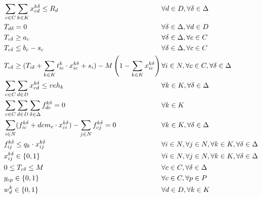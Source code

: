\documentclass[preprint,review,12pt]{elsarticle}
\begin{document}
\begin{align}
	& \sum\limits_{c \in C} \sum\limits_{k \in K}x_{cd}^{k\delta} \leq R_d  && \text{\hspace{-1cm}} \forall d \in D, \forall \delta \in \Delta \label{PCVRP_CapacityD}\\
	& T_{d\delta} = 0  && \text{\hspace{-1cm}} \forall \delta \in \Delta, \forall d \in D \label{PCVRP_InitialT}\\
	& T_{c\delta} \geq a_c  && \text{\hspace{-1cm}} \forall \delta \in \Delta, \forall c \in C \label{PCVRP_ArriveT}\\
	& T_{c\delta} \leq b_c - s_c && \text{\hspace{-1cm}} \forall \delta \in \Delta,\forall c \in C \label{PCVRP_DepartT}\\
	& T_{c\delta} \geq (T_{i\delta} + \sum\limits_{k \in K} t_{ic}^k \cdot  x_{ic}^{k\delta} + s_i) - M \left(1 - \sum\limits_{k \in K}x_{ic}^{k\delta} \right) \qquad && \text{\hspace{-1cm}} \forall i \in N, \forall c \in C, \forall \delta \in \Delta \label{PCVRP_OrderT}\\
	& \sum\limits_{c \in C} \sum\limits_{d \in D} x_{cd}^{k\delta} \leq veh_k && \text{\hspace{-1cm}} \forall k \in K, \forall \delta \in \Delta \label{PCVRP_NumVeh} \\
	& \sum\limits_{c \in C} \sum\limits_{d \in D} \sum\limits_{\delta \in \Delta} f_{dc}^{k\delta} = 0 && \text{\hspace{-1cm}} \forall k \in K \label{PCVRP_LoadIni} \\
	& \sum\limits_{i \in N} (f_{ic}^{k\delta} + dem_c \cdot x_{ci}^{k\delta})-\sum\limits_{j \in N} f_{cj}^{k\delta} = 0 && \text{\hspace{-1cm}} \forall k \in K, \forall \delta \in \Delta \label{PCVRP_LoadFlow} \\
	& f_{ij}^{k\delta} \leq q_k \cdot x_{ij}^{k\delta} && \text{\hspace{-1cm}} \forall i \in N, \forall j \in N, \forall k \in K, \forall \delta \in \Delta \label{PCVRP_fdomain} \\
	& x_{ij}^{k\delta} \in\{0,1\} && \text{\hspace{-1cm}} \forall i \in N, \forall j \in N, \forall k \in K,\forall \delta \in \Delta \label{PCVRP_DomainX}\\
	& 0 \leq T_{c\delta} \leq M && \text{\hspace{-1cm}} \forall c \in C, \forall \delta \in \Delta \label{PCVRP_DomainT}\\
	& y_{cp} \in\{0,1\} && \text{\hspace{-1cm}} \forall c \in C,\forall p \in P \label{PCVRP_DomainY}\\
	& w_d^k \in\{0,1\} && \text{\hspace{-1cm}} \forall d \in D,\forall k \in K \label{PCVRP_DomainW}
\end{align}
\end{document}
